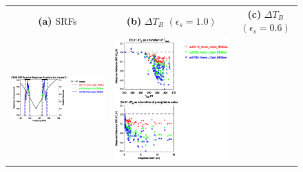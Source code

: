 \begin{figure}[H]
  \centering
  \begin{tabular}{c c c}
    \textsf{\textbf{(a)} SRFs} &
    \textsf{\textbf{(b)} $\Delta T_B$ $(\epsilon_s = 1.0)$} &
    \textsf{\textbf{(c)} $\Delta T_B$ $(\epsilon_s = 0.6)$} \\
    \includegraphics[bb=80 400 280 558,clip,scale=0.85]{graphics/srf/Tset/atms_npp.ch21.osrf.eps} &
    \includegraphics[bb=85 400 260 558,clip,scale=0.85]{graphics/dtb/Tset/e1.0_r0.0/atms_npp.ch21.dTb.eps} & 

\end{tabular}
\end{figure}
